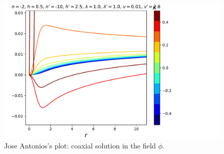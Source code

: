 \documentclass[10pt,a4paper]{article}
\begin{document}
\begin{figure}
	\includegraphics[scale=0.8]{jacoaxialtovicparam.pdf}
	\caption{Jose Antonios's plot: coaxial solution in the field $\phi$.}
\end{figure}

\end{document}
